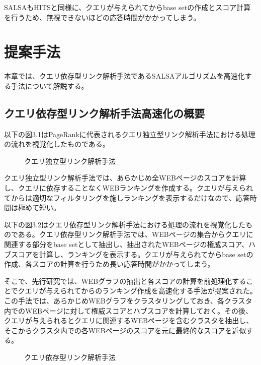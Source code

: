 \documentclass[a4paper,11pt]{jreport}
\begin{document}
SALSAもHITSと同様に、クエリが与えられてからbase setの作成とスコア計算を行うため、無視できないほどの応答時間がかかってしまう。

\chapter{提案手法}

本章では、クエリ依存型リンク解析手法であるSALSAアルゴリズムを高速化する手法について解説する。

\section{クエリ依存型リンク解析手法高速化の概要}

以下の図3.1はPageRankに代表されるクエリ独立型リンク解析手法における処理の流れを視覚化したものである。

\begin{figure}[htbp]
\begin{center}
\end{center}
\caption{クエリ独立型リンク解析手法}
\label{figure:sample}
\end{figure}

クエリ独立型リンク解析手法では、あらかじめ全WEBページのスコアを計算し、クエリに依存することなくWEBランキングを作成する。クエリが与えられてからは適切なフィルタリングを施しランキングを表示するだけなので、応答時間は極めて短い。

以下の図3.2はクエリ依存型リンク解析手法における処理の流れを視覚化したものである。クエリ依存型リンク解析手法では、WEBページの集合からクエリに関連する部分をbase setとして抽出し、抽出されたWEBページの権威スコア、ハブスコアを計算し、ランキングを表示する。クエリが与えられてからbase setの作成、各スコアの計算を行うため長い応答時間がかかってしまう。

そこで、先行研究では、WEBグラフの抽出と各スコアの計算を前処理化することでクエリが与えられてからのランキング作成を高速化する手法が提案された。この手法では、あらかじめWEBグラフをクラスタリングしておき、各クラスタ内でのWEBページに対して権威スコアとハブスコアを計算しておく。その後、クエリが与えられるとクエリに関連するWEBページを含むクラスタを抽出し、そこからクラスタ内での各WEBページのスコアを元に最終的なスコアを近似する。

\begin{figure}[htbp]
\begin{center}
\end{center}
\caption{クエリ依存型リンク解析手法}
\label{figure:sample}
\end{figure}
\end{document}
